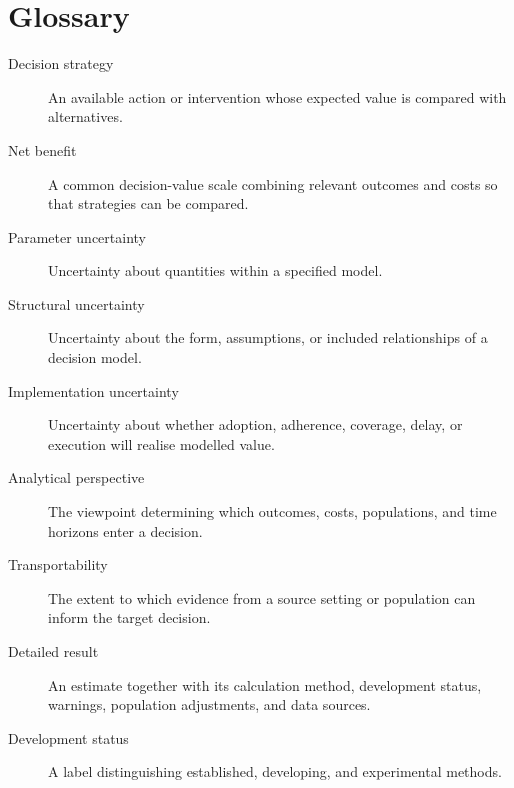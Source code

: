 \section{Glossary}\label{sec:glossary}

\begin{description}
  \item[Decision strategy] An available action or intervention whose expected
  value is compared with alternatives.
  \item[Net benefit] A common decision-value scale combining relevant outcomes
  and costs so that strategies can be compared.
  \item[Parameter uncertainty] Uncertainty about quantities within a specified
  model.
  \item[Structural uncertainty] Uncertainty about the form, assumptions, or
  included relationships of a decision model.
  \item[Implementation uncertainty] Uncertainty about whether adoption,
  adherence, coverage, delay, or execution will realise modelled value.
  \item[Analytical perspective] The viewpoint determining which outcomes,
  costs, populations, and time horizons enter a decision.
  \item[Transportability] The extent to which evidence from a source setting or
  population can inform the target decision.
  \item[Detailed result] An estimate together with its calculation method,
  development status, warnings, population adjustments, and data sources.
  \item[Development status] A label distinguishing established, developing,
  and experimental methods.
\end{description}
